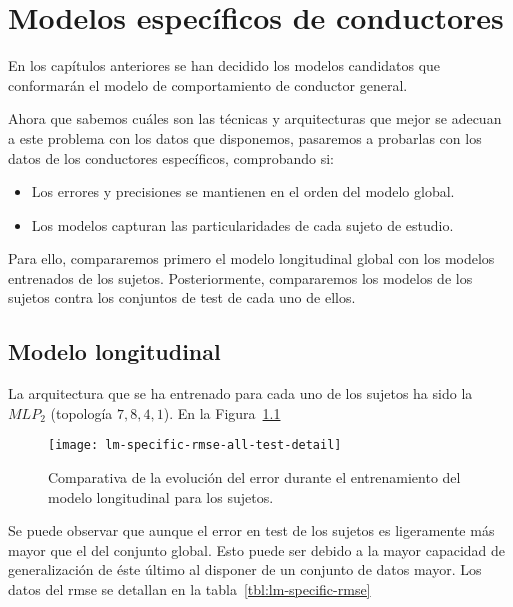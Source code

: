 \chapter{Modelos específicos de conductores}
\label{ch:specific-models}

En los capítulos anteriores se han decidido los modelos candidatos que conformarán el modelo de comportamiento de conductor general.

Ahora que sabemos cuáles son las técnicas y arquitecturas que mejor se adecuan a este problema con los datos que disponemos, pasaremos a probarlas con los datos de los conductores específicos, comprobando si:

\begin{itemize}
	\item Los errores y precisiones se mantienen en el orden del modelo global.
	\item Los modelos capturan las particularidades de cada sujeto de estudio.
\end{itemize}

Para ello, compararemos primero el modelo longitudinal global con los modelos entrenados de los sujetos. Posteriormente, compararemos los modelos de los sujetos contra los conjuntos de test de cada uno de ellos.

\section{Modelo longitudinal}

La arquitectura que se ha entrenado para cada uno de los sujetos ha sido la $MLP_2$ (topología $7, 8, 4, 1$). En la Figura~\ref{fig:lm-specific-training-validation-and-test-comparison} 

\begin{figure}
	\centering
	\texttt{[image: lm-specific-rmse-all-test-detail]}
	\caption[Comparativa de la evolución del error de test entre los sujetos de la arquitectura seleccionada para el modelo longitudinal. durante el entrenamiento del modelo longitudinal para los sujetos]{Comparativa de la evolución del error durante el entrenamiento del modelo longitudinal para los sujetos.}
	\label{fig:lm-specific-training-validation-and-test-comparison}
\end{figure}

Se puede observar que aunque el error en test de los sujetos es ligeramente más mayor que el del conjunto global. Esto puede ser debido a la mayor capacidad de generalización de éste último al disponer de un conjunto de datos mayor. Los datos del \ac{rmse} se detallan en la tabla~\ref{tbl:lm-specific-rmse}

